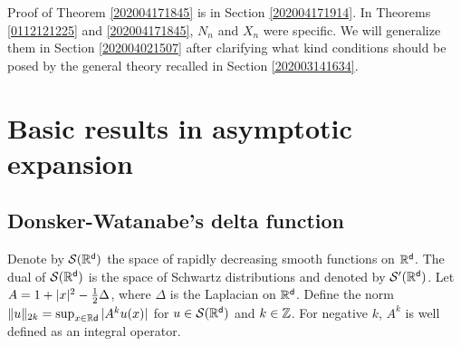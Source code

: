 \documentclass[a4paper,12pt]{article}
\numberwithin{equation}{section}
\numberwithin{equation}{section}
\def\sfd{{\sf d}}
\begin{document}
Proof of Theorem \ref{202004171845} is in Section \ref{202004171914}. 
In Theorems \ref{0112121225} and \ref{202004171845}, 
$N_n$ and $X_n$ were specific. 
We will generalize them in Section \ref{202004021507} after clarifying what kind conditions 
should be posed by the general theory recalled in Section \ref{202003141634}. 


\section{Basic results in asymptotic expansion}


\subsection{Donsker-Watanabe's delta function}\label{202005171900}
Denote by $\cals(\bbR^\sfd)$ the space of rapidly decreasing smooth functions on $\bbR^\sfd$. 
The dual of $\cals(\bbR^\sfd)$ is the space of Schwartz distributions and denoted by $\cals'(\bbR^\sfd)$. 
Let $A=1+|x|^2-\frac{1}{2}\Delta$, where $\Delta$ is the Laplacian on $\bbR^\sfd$. 
Define the norm $\|u\|_{2k}=\sup_{x\in\bbR\sfd}|A^ku(x)|$ for $u\in\cals(\bbR^\sfd)$ and 
$k\in{\mathbb Z}$. 
For negative $k$, $A^k$ is well defined as an integral operator. 
\end{document}
